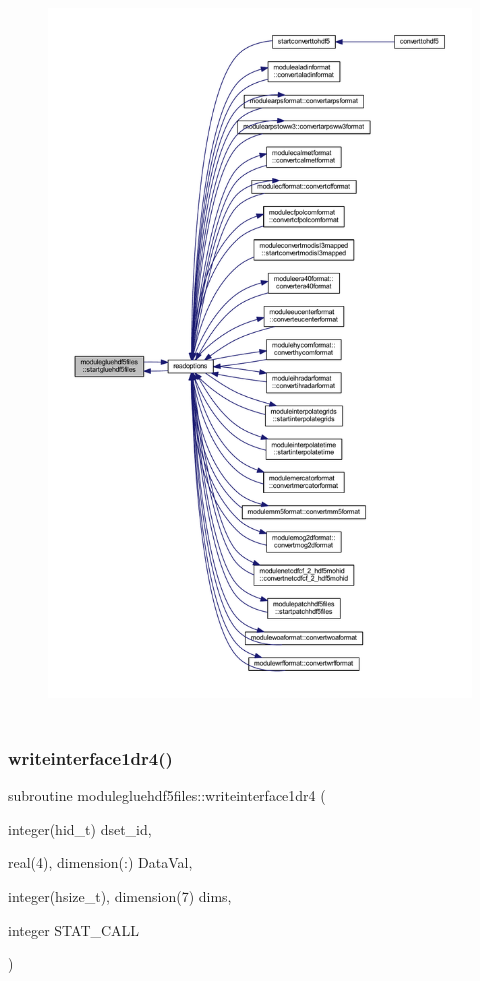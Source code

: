 \begin{figure}[H]
\begin{center}
\leavevmode
\includegraphics[height=550pt]{namespacemodulegluehdf5files_ab2346fccf5401da3d9edc023aaadba24_icgraph}
\end{center}
\end{figure}
\mbox{\label{namespacemodulegluehdf5files_a6eedc150fe0ffbc5acbf71f7281bad4e}} 
\subsubsection{\texorpdfstring{writeinterface1dr4()}{writeinterface1dr4()}}
{\footnotesize\ttfamily subroutine modulegluehdf5files\+::writeinterface1dr4 (\begin{DoxyParamCaption}\item[{integer(hid\+\_\+t)}]{dset\+\_\+id,  }\item[{real(4), dimension(\+:)}]{Data\+Val,  }\item[{integer(hsize\+\_\+t), dimension(7)}]{dims,  }\item[{integer}]{S\+T\+A\+T\+\_\+\+C\+A\+LL }\end{DoxyParamCaption})\hspace{0.3cm}{\ttfamily [private]}}

